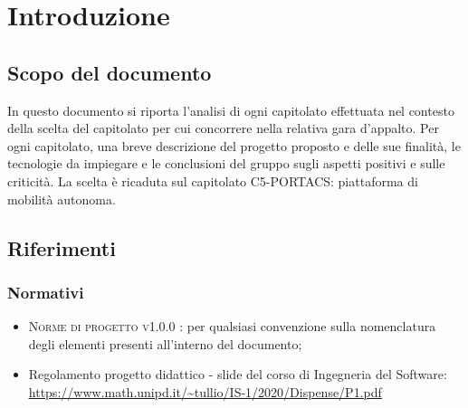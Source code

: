 \section{Introduzione}
\subsection{Scopo del documento}
In questo documento si riporta l'analisi di ogni capitolato effettuata nel contesto della scelta del capitolato per cui concorrere nella relativa gara d'appalto. Per ogni capitolato, una breve descrizione del progetto proposto e delle sue finalità, le tecnologie da impiegare e le conclusioni del gruppo sugli aspetti positivi e sulle criticità. La scelta è ricaduta sul capitolato C5-PORTACS: piattaforma di mobilità autonoma.


\subsection{Riferimenti}

\subsubsection{Normativi}

\begin{itemize}
	\item \textsc{Norme di progetto v1.0.0 }: per qualsiasi convenzione sulla nomenclatura degli elementi presenti all’interno del documento;
	\item Regolamento progetto didattico - slide del corso di Ingegneria del Software: \newline \uline{\url{https://www.math.unipd.it/~tullio/IS-1/2020/Dispense/P1.pdf}}
\end{itemize}

